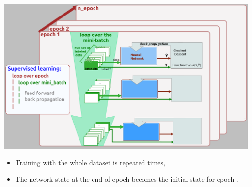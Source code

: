 \documentclass[11pt,serif,mathserif,compress,hyperref={colorlinks}]{beamer}
\begin{document}
\begin{frame}{}
  \includegraphics[width=\textwidth]{./images/NetworkTraining_2.png}
  {\small
    \vspace*{-5mm}\begin{itemize}
    \item Training with the whole dataset is repeated  times,
    \item The network state at the end of epoch  becomes the initial state for epoch .
    \end{itemize}
    }
\end{frame}
\end{document}
